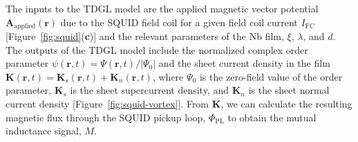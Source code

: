 \documentclass[%
 reprint,
 superscriptaddress,
 amsmath,
 amssymb,
 amsfonts,
 aps,
 prb,
]{revtex4-2}
\newcommand{\FC}{\mathrm{FC}}
\newcommand{\PL}{\mathrm{PL}}
\newcommand{\um}{\mu\mathrm{m}}
\begin{document}

The inputs to the TDGL model are the applied magnetic vector potential $\mathbf{A}_\mathrm{applied}(\mathbf{r})$ due to the SQUID field coil for a given field coil current $I_\FC$ [Figure~\ref{fig:squid}({\bf c})] and the relevant parameters of the Nb film, $\xi$, $\lambda$, and $d$. The outputs of the TDGL model include the normalized complex order parameter $\psi(\mathbf{r}, t)=\Psi(\mathbf{r}, t)/|\Psi_0|$ and the sheet current density in the film $\mathbf{K}(\mathbf{r},t)=\mathbf{K}_s(\mathbf{r}, t)+\mathbf{K}_n(\mathbf{r}, t)$, where $\Psi_0$ is the zero-field value of the order parameter, $\mathbf{K}_s$ is the sheet supercurrent density, and $\mathbf{K}_n$ is the sheet normal current density [Figure~\ref{fig:squid-vortex}]. From $\mathbf{K}$, we can calculate the resulting magnetic flux through the SQUID pickup loop, $\Phi_\PL$ to obtain the mutual inductance signal, $M$.
\end{document}

